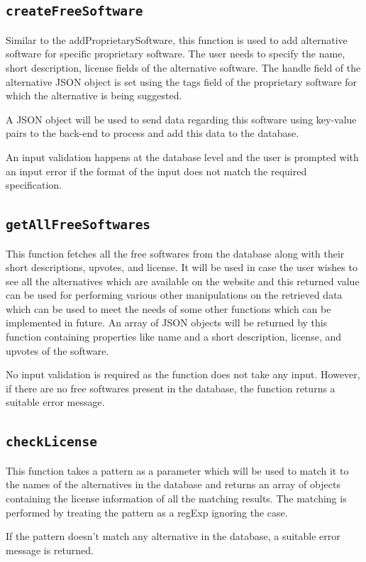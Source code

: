 \subsection{\texttt{createFreeSoftware}}
Similar to the addProprietarySoftware, this function is used to add alternative software for specific proprietary software. The user needs to specify the name, short description, license fields of the alternative software. The handle field of the alternative JSON object is set using the tags field of the proprietary software for which the alternative is being suggested.

A JSON object will be used to send data regarding this software using key-value pairs to the back-end to process and add this data to the database.

An input validation happens at the database level and the user is prompted with an input error if the format of the input does not match the required specification.

\subsection{\texttt{getAllFreeSoftwares}}
This function fetches all the free softwares from the database along with their short descriptions, upvotes, and license. It will be used in case the user wishes to see all the alternatives which are available on the website and this returned value can be used for performing various other manipulations on the retrieved data which can be used to meet the needs of some other functions which can be implemented in future.
An array of JSON objects will be returned by this function containing properties like name and a short description, license, and upvotes of the software.

No input validation is required as the function does not take any input. However, if there are no free softwares present in the database, the function returns a suitable error message.


\subsection{\texttt{checkLicense}}
This function takes a pattern as a parameter which will be used to match it to the names of the alternatives in the database and returns an array of objects containing the license information of all the matching results. The matching is performed by treating the pattern as a regExp ignoring the case.

If the pattern doesn’t match any alternative in the database, a suitable error message is returned.

